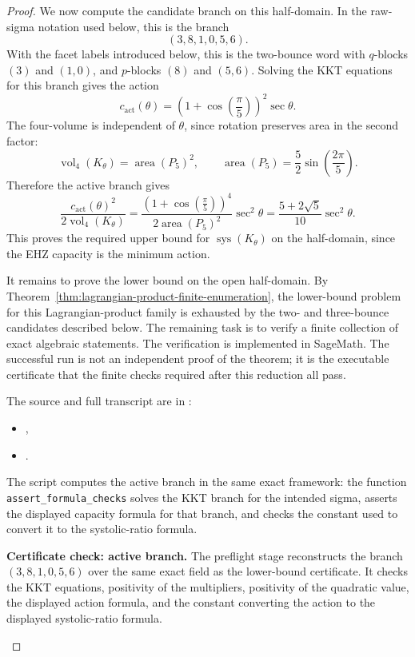 \begin{proof}
We now compute the candidate branch on this half-domain. In the raw-sigma
notation used below, this is the branch
\[
  (3,8,1,0,5,6).
\]
With the facet labels introduced below, this is the two-bounce word with
\(q\)-blocks \((3)\) and \((1,0)\), and \(p\)-blocks \((8)\) and \((5,6)\).
Solving the KKT equations for this branch gives the action
\[
  c_{\mathrm{act}}(\theta)
  =
  \left(1+\cos\left(\frac{\pi}{5}\right)\right)^2\sec\theta .
\]
The four-volume is independent of \(\theta\), since rotation preserves area in
the second factor:
\[
  \operatorname{vol}_4(K_\theta)
  =
  \operatorname{area}(P_5)^2,
  \qquad
  \operatorname{area}(P_5)
  =
  \frac{5}{2}\sin\left(\frac{2\pi}{5}\right).
\]
Therefore the active branch gives
\[
  \frac{c_{\mathrm{act}}(\theta)^2}{2\operatorname{vol}_4(K_\theta)}
  =
  \frac{\left(1+\cos\left(\frac{\pi}{5}\right)\right)^4}
       {2\operatorname{area}(P_5)^2}\sec^2\theta
  =
  \frac{5+2\sqrt{5}}{10}\sec^2\theta .
\]
This proves the required upper bound for \(\operatorname{sys}(K_\theta)\) on
the half-domain, since the EHZ capacity is the minimum action.

It remains to prove the lower bound on the open half-domain. By
Theorem~\ref{thm:lagrangian-product-finite-enumeration}, the lower-bound
problem for this Lagrangian-product family is exhausted by the two- and
three-bounce candidates described below. The remaining task is to verify a
finite collection of exact algebraic statements. The verification is
implemented in SageMath. The successful run is not an independent proof of the
theorem; it is the executable certificate that the finite checks required after
this reduction all pass.

The source and full transcript are in
:
\begin{itemize}
  \item {},
  \item {}.
\end{itemize}
The script computes the active branch in the same exact framework: the function
\texttt{assert\_formula\_checks} solves the KKT branch for the intended sigma,
asserts the displayed capacity formula for that branch, and checks the constant
used to convert it to the systolic-ratio formula.

\begin{certificatecheck}
\noindent\textbf{Certificate check: active branch.}
The preflight stage reconstructs the branch
\((3,8,1,0,5,6)\) over the same exact field as the lower-bound certificate. It
checks the KKT equations, positivity of the multipliers, positivity of the
quadratic value, the displayed action formula, and the constant converting the
action to the displayed systolic-ratio formula.
\end{certificatecheck}


\end{proof}
